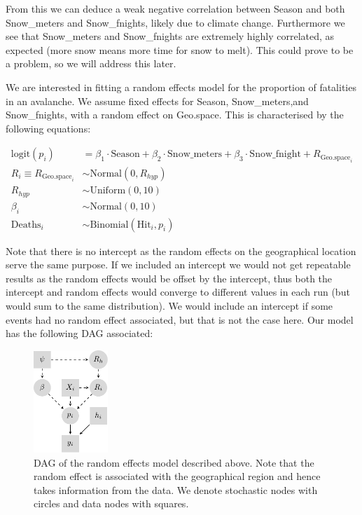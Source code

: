 \documentclass[10pt]{extarticle}
\begin{document}
From this we can deduce a weak negative correlation between Season and both Snow\_meters and Snow\_fnights, likely due to climate change. Furthermore we see that Snow\_meters and Snow\_fnights are extremely highly correlated, as expected (more snow means more time for snow to melt). This could prove to be a problem, so we will address this later. 

We are interested in fitting a random effects model for the proportion of fatalities in an avalanche. We assume fixed effects for Season, Snow\_meters,and Snow\_fnights, with a random effect on Geo.space. This is characterised by the following equations:

\begin{align*}
\mathrm{logit}(p_i) &= \beta_1 \cdot \mathrm{Season} + \beta_2 \cdot \mathrm{Snow\_meters} + \beta_3 \cdot \mathrm{Snow\_fnight} + R_{\mathrm{Geo.space}_i}\\
R_i \equiv R_{\mathrm{Geo.space}_i} &\sim \mathrm{Normal}(0, R_{hyp})\\
R_{hyp} &\sim \mathrm{Uniform}(0, 10)\\
\beta_i &\sim \mathrm{Normal}(0, 10)\\
\mathrm{Deaths}_i &\sim \mathrm{Binomial}(\mathrm{Hit}_i, p_i)
\end{align*}

Note that there is no intercept as the random effects on the geographical location serve the same purpose. If we included an intercept we would not get repeatable results as the random effects would be offset by the intercept, thus both the intercept and random effects would converge to different values in each run (but would sum to the same distribution). We would include an intercept if some events had no random effect associated, but that is not the case here. Our model has the following DAG associated:

\begin{figure}[H]
	\centering
	\includegraphics[width = 0.25\textwidth]{DAG-figure0}
	\caption{DAG of the random effects model described above. Note that the random effect is associated with the geographical region and hence takes information from the data. We denote stochastic nodes with circles and data nodes with squares.}
	\label{fig:dag0}
\end{figure}
\end{document}

